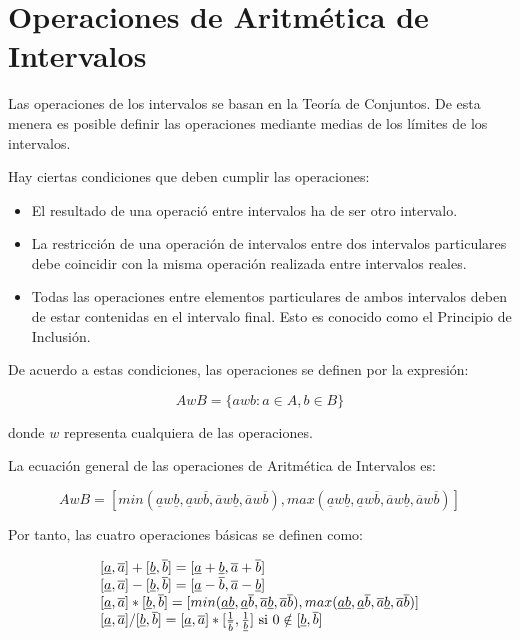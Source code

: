 \section{Operaciones de Aritmética de Intervalos}

Las operaciones de los intervalos se basan en la Teoría de Conjuntos. De esta menera es posible definir las operaciones mediante medias de los límites de los intervalos.
\par Hay ciertas condiciones que deben cumplir las operaciones:

\begin{itemize}
	\item El resultado de una operació entre intervalos ha de ser otro intervalo.
	\item La restricción de una operación de intervalos entre dos intervalos particulares debe coincidir con la misma operación realizada entre intervalos reales.
	\item Todas las operaciones entre elementos particulares de ambos intervalos deben de estar contenidas en el intervalo final. Esto es conocido como el Principio de Inclusión.
\end{itemize}

De acuerdo a estas condiciones, las operaciones se definen por la expresión:

\begin{equation}
AwB = \{ awb : a \in A, b \in B \}
\end{equation}

donde $w$ representa cualquiera de las operaciones.
\par La ecuación general de las operaciones de Aritmética de Intervalos es:

\begin{equation}
AwB = [ min(\underline{a}w\underline{b},\underline{a}w\overline{b},\overline{a}w\underline{b},\overline{a}w\overline{b}), max(\underline{a}w\underline{b},\underline{a}w\overline{b},\overline{a}w\underline{b},\overline{a}w\overline{b}) ]
\nonumber
\end{equation}

Por tanto, las cuatro operaciones básicas se definen como:

\begin{equation}
\begin{tabular}{l}
$[\underline{a},\overline{a}] + [\underline{b},\overline{b}] = [\underline{a} + \underline{b},\overline{a} + \overline{b}]$ \\
$[\underline{a},\overline{a}] - [\underline{b},\overline{b}] = [\underline{a} - \overline{b},\overline{a} - \underline{b}]$ \\
$[\underline{a},\overline{a}] * [\underline{b},\overline{b}] = [min(\underline{a}\underline{b},\underline{a}\overline{b},\overline{a}\underline{b},\overline{a}\overline{b}), max(\underline{a}\underline{b},\underline{a}\overline{b},\overline{a}\underline{b},\overline{a}\overline{b})]$ \\
$[\underline{a},\overline{a}] / [\underline{b},\overline{b}] = [\underline{a},\overline{a}]*[\frac{1}{\overline{b}},\frac{1}{\underline{b}}] \text{ si } 0 \notin [\underline{b},\overline{b}]$
\end{tabular}
\nonumber
\end{equation}

